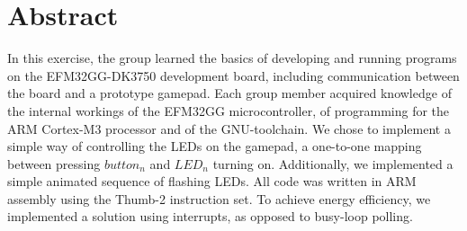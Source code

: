 \chapter*{Abstract}
In this exercise, the group learned the basics of developing and running programs on the EFM32GG-DK3750 development board, including communication between the board and a prototype gamepad. Each group member acquired knowledge of the internal workings of the EFM32GG microcontroller, of programming for the ARM Cortex-M3 processor and of the GNU-toolchain.
We chose to implement a simple way of controlling the LEDs on the gamepad, a one-to-one mapping between pressing $button_n$ and $LED_n$ turning on. Additionally, we implemented a simple animated sequence of flashing LEDs. All code was written in ARM assembly using the Thumb-2 instruction set. To achieve energy efficiency, we implemented a solution using interrupts, as opposed to busy-loop polling.
